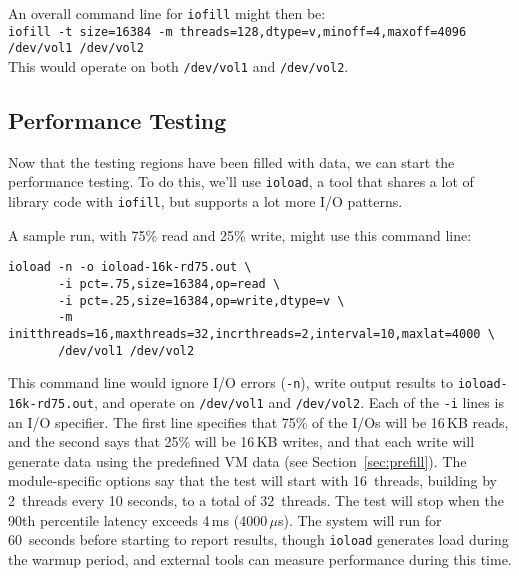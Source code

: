 \documentclass[letterpaper,11pt]{article}
\newcommand{\ioload}{\texttt{ioload}\xspace}
\newcommand{\iofill}{\texttt{iofill}\xspace}
\begin{document}
An overall command line for \iofill might then be: \\
\verb+iofill -t size=16384 -m threads=128,dtype=v,minoff=4,maxoff=4096 /dev/vol1 /dev/vol2+ \\
This would operate on both \verb+/dev/vol1+ and \verb+/dev/vol2+.

\subsection{Performance Testing}

Now that the testing regions have been filled with data, we can start the performance
testing.  To do this, we'll use \ioload, a tool that shares a lot of library code with
\iofill, but supports a lot more I/O patterns.

A sample run, with 75\% read and 25\% write, might use this command line: \\
\begin{verbatim}
ioload -n -o ioload-16k-rd75.out \
       -i pct=.75,size=16384,op=read \
       -i pct=.25,size=16384,op=write,dtype=v \
       -m initthreads=16,maxthreads=32,incrthreads=2,interval=10,maxlat=4000 \
       /dev/vol1 /dev/vol2
\end{verbatim}

This command line would ignore I/O errors (\verb+-n+), write output results to
\verb+ioload-16k-rd75.out+, and operate on \verb+/dev/vol1+ and \verb+/dev/vol2+.  Each of
the \verb+-i+ lines is an I/O specifier.  The first line specifies that 75\% of the I/Os
will be 16\,KB reads, and the second says that 25\% will be 16\,KB writes, and that each
write will generate data using the predefined VM data (see Section~\ref{sec:prefill}).
The module-specific options say that the test will start with 16~threads, building by
2~threads every 10 seconds, to a total of 32~threads.  The test will stop when the 90th
percentile latency exceeds 4\,ms (4000\,$\mu$s).  The system will run for 60~seconds
before starting to report results, though \ioload generates load during the warmup period,
and external tools can measure performance during this time.
\end{document}
